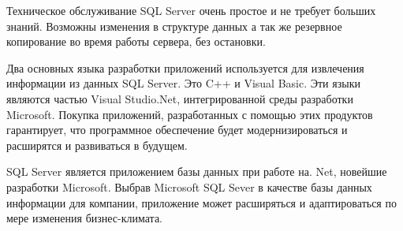 Техническое обслуживание  SQL Server очень простое и не требует больших знаний. Возможны изменения в структуре данных а так же резервное копирование во время работы сервера, без остановки.

 Два основных языка разработки приложений используется для извлечения информации из данных SQL Server. Это  C++ и Visual Basic. Эти языки являются частью Visual Studio.Net,  интегрированной среды разработки Microsoft. Покупка приложений, разработанных с помощью этих продуктов гарантирует, что программное обеспечение будет модернизироваться и расширятся и развиваться в будущем. 

SQL Server является приложением базы данных  при работе на. Net, новейшие разработки Microsoft.   Выбрав Microsoft SQL Sever в качестве базы данных информации для  компании, приложение может расширяться и адаптироваться по мере изменения бизнес-климата. 
  
